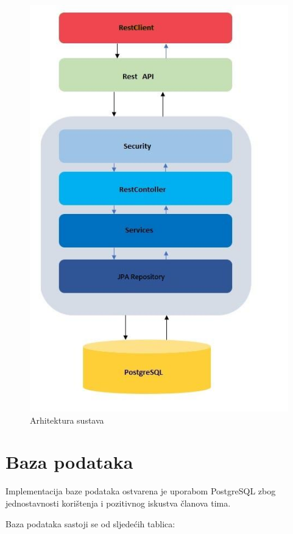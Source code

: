 			\begin{figure}[H]
			\includegraphics[scale=0.9]{slike/arhitektura3.jpg} %
			\centering
			\caption {Arhitektura sustava}
			\label{fig:promjene}
		\end{figure}

		\newpage	
		\section{Baza podataka}
			
		
		
		Implementacija baze podataka ostvarena je uporabom PostgreSQL zbog jednostavnosti korištenja i pozitivnog iskustva članova tima. 
		
		Baza podataka sastoji se od sljedećih tablica:
		
